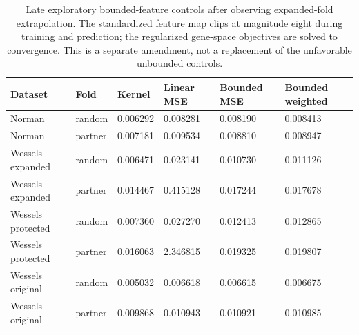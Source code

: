 \begin{table}[htbp]\centering\normalsize\begin{tabular}{llllll}
\toprule
Dataset & Fold & Kernel & Linear MSE & Bounded MSE & Bounded weighted \\
\midrule
Norman & random & 0.006292 & 0.008281 & 0.008190 & 0.008413 \\
Norman & partner & 0.007181 & 0.009534 & 0.008810 & 0.008947 \\
Wessels expanded & random & 0.006471 & 0.023141 & 0.010730 & 0.011126 \\
Wessels expanded & partner & 0.014467 & 0.415128 & 0.017244 & 0.017678 \\
Wessels protected & random & 0.007360 & 0.027270 & 0.012413 & 0.012865 \\
Wessels protected & partner & 0.016063 & 2.346815 & 0.019325 & 0.019807 \\
Wessels original & random & 0.005032 & 0.006618 & 0.006615 & 0.006675 \\
Wessels original & partner & 0.009868 & 0.010943 & 0.010921 & 0.010985 \\
\bottomrule
\end{tabular}
\caption{Late exploratory bounded-feature controls after observing expanded-fold extrapolation. The standardized feature map clips at magnitude eight during training and prediction; the regularized gene-space objectives are solved to convergence. This is a separate amendment, not a replacement of the unfavorable unbounded controls.}\end{table}
